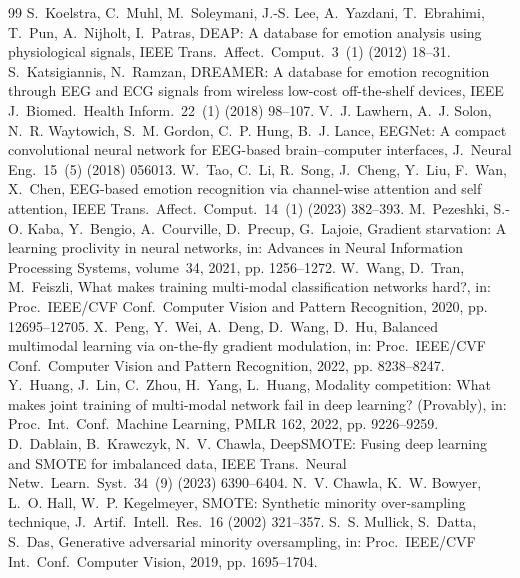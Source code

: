 \documentclass[a4paper,fleqn]{cas-sc}
\begin{document}
\begin{thebibliography}{99}
 S.~Koelstra, C.~Muhl, M.~Soleymani, J.-S. Lee, A.~Yazdani, T.~Ebrahimi, T.~Pun, A.~Nijholt, I.~Patras, DEAP: A database for emotion analysis using physiological signals, IEEE Trans.\ Affect.\ Comput.\ 3~(1) (2012) 18--31.
 S.~Katsigiannis, N.~Ramzan, DREAMER: A database for emotion recognition through EEG and ECG signals from wireless low-cost off-the-shelf devices, IEEE J.\ Biomed.\ Health Inform.\ 22~(1) (2018) 98--107.
 V.~J. Lawhern, A.~J. Solon, N.~R. Waytowich, S.~M. Gordon, C.~P. Hung, B.~J. Lance, EEGNet: A compact convolutional neural network for EEG-based brain--computer interfaces, J.\ Neural Eng.\ 15~(5) (2018) 056013.
 W.~Tao, C.~Li, R.~Song, J.~Cheng, Y.~Liu, F.~Wan, X.~Chen, EEG-based emotion recognition via channel-wise attention and self attention, IEEE Trans.\ Affect.\ Comput.\ 14~(1) (2023) 382--393.
 M.~Pezeshki, S.-O. Kaba, Y.~Bengio, A.~Courville, D.~Precup, G.~Lajoie, Gradient starvation: A learning proclivity in neural networks, in: Advances in Neural Information Processing Systems, volume~34, 2021, pp. 1256--1272.
 W.~Wang, D.~Tran, M.~Feiszli, What makes training multi-modal classification networks hard?, in: Proc.\ IEEE/CVF Conf.\ Computer Vision and Pattern Recognition, 2020, pp. 12695--12705.
 X.~Peng, Y.~Wei, A.~Deng, D.~Wang, D.~Hu, Balanced multimodal learning via on-the-fly gradient modulation, in: Proc.\ IEEE/CVF Conf.\ Computer Vision and Pattern Recognition, 2022, pp. 8238--8247.
 Y.~Huang, J.~Lin, C.~Zhou, H.~Yang, L.~Huang, Modality competition: What makes joint training of multi-modal network fail in deep learning? (Provably), in: Proc.\ Int.\ Conf.\ Machine Learning, PMLR 162, 2022, pp. 9226--9259.
 D.~Dablain, B.~Krawczyk, N.~V. Chawla, DeepSMOTE: Fusing deep learning and SMOTE for imbalanced data, IEEE Trans.\ Neural Netw.\ Learn.\ Syst.\ 34~(9) (2023) 6390--6404.
 N.~V. Chawla, K.~W. Bowyer, L.~O. Hall, W.~P. Kegelmeyer, SMOTE: Synthetic minority over-sampling technique, J.\ Artif.\ Intell.\ Res.\ 16 (2002) 321--357.
 S.~S. Mullick, S.~Datta, S.~Das, Generative adversarial minority oversampling, in: Proc.\ IEEE/CVF Int.\ Conf.\ Computer Vision, 2019, pp. 1695--1704.

\end{thebibliography}
\end{document}
